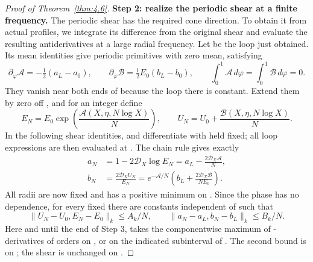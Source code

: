 \begin{proof}[Proof of Theorem~\ref{thm:4.6}]
\noindent\textbf{Step 2: realize the periodic shear at a finite frequency.}
The periodic shear has the required cone direction. To obtain it from actual profiles, we integrate
its difference from the original shear and evaluate the resulting antiderivatives at a large radial
frequency. Let  be the loop just obtained. Its
mean identities give periodic primitives  with zero
mean, satisfying
\[
\partial_\varphi\mathscr A=-\tfrac12(a_L-a_0),
\qquad
\partial_\varphi\mathscr B=\tfrac12E_0(b_L-b_0),
\qquad
\int_0^1\mathscr A\,d\varphi=\int_0^1\mathscr B\,d\varphi=0.
\]
They vanish near both ends of  because the loop there is
constant. Extend them by zero off , and for an integer
 define
\begin{equation}
E_N=E_0\exp\!\left(\frac{\mathscr A(X,\eta,N\log X)}{N}\right),
\qquad
U_N=U_0+\frac{\mathscr B(X,\eta,N\log X)}{N}.
\tag{4.38}\label{eq:4.38}
\end{equation}
In the following shear identities,  and
 differentiate  with
 held fixed; all loop expressions are then evaluated at
. The chain rule gives exactly
\begin{align*}
a_N&=1-2\mathcal D_X\log E_N=a_L-\frac{2\mathcal D_X\mathscr A}{N},\\
b_N&=\frac{2\mathcal D_XU_N}{E_N}
=e^{-\mathscr A/N}\left(b_L+\frac{2\mathcal D_X\mathscr B}{NE_0}\right).
\end{align*}
All radii are now fixed and  has a positive minimum on
. Since the phase has no
 dependence, for every fixed
 there are constants independent of
 such that
\begin{equation}
\lVert U_N-U_0,E_N-E_0\rVert_k\le A_k/N,
\qquad
\lVert a_N-a_L,b_N-b_L\rVert_k\le B_k/N.
\tag{4.39}\label{eq:4.39}
\end{equation}
Here and until the end of Step 3,  takes the
componentwise maximum of -derivatives of orders
 on
, or on the indicated subinterval of
. The second bound is on
; the shear is unchanged on
.


\end{proof}
